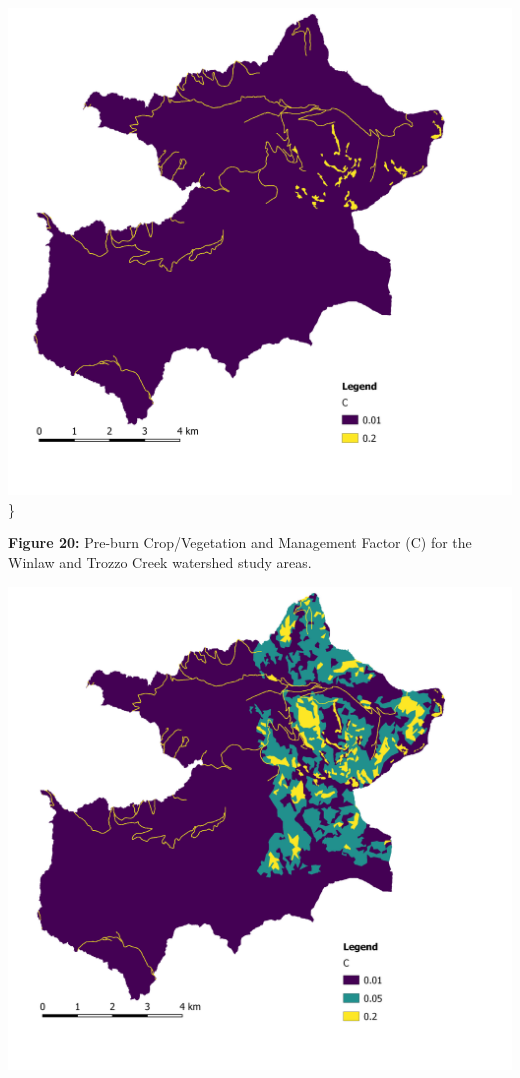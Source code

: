 \documentclass[
]{article}
\begin{document}
\includegraphics{img/c_factor_pre_burn_roads10m.png}\}

\textbf{Figure 20:} Pre-burn Crop/Vegetation and Management Factor (C) for the Winlaw and Trozzo Creek watershed study areas.

\includegraphics{img/c_factor_post_burn_roads10m.png}
\end{document}

